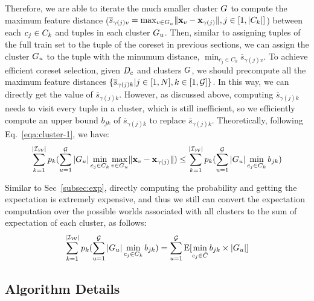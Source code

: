 Therefore,  we are able to iterate the much smaller cluster $G$ to compute  the maximum feature distance (\ie $\overline{s}_{\gamma(j)v} = \max_{v \in G_u} \lVert\mathbf{x}_v - \mathbf{x}_{\gamma(j)}\rVert, j \in [1,|C_k|]$) between each $c_j \in C_k$ and tuples in each cluster $G_u$. Then, similar to assigning tuples of the full train set to the tuple of the coreset in previous sections, we can assign the cluster $G_u$ to the tuple  with the minumum distance, \ie $\min_{c_j\in C_k} \overline{s}_{\gamma(j)v}$. To achieve efficient coreset selection, given $D_c$ and clusters $G$, we should precompute all the maximum feature distances $\{\overline{s}_{\gamma(j)k}|j \in [1,N], k \in [1,\mathcal{G}]\}$. In this way, we can directly get the value of $\overline{s}_{\gamma(j)k}$. However, as discussed above, computing $\overline{s}_{\gamma(j)k}$ needs to visit every tuple in a cluster, which is still inefficient, so we  efficiently compute an upper bound $b_{jk}$ of  $\overline{s}_{\gamma(j)k}$ to replace $\overline{s}_{\gamma(j)k}$. Theoretically, following Eq.~\ref{eqa:cluster-1}, we have:
\vspace{-0.5em}
\begin{equation}\label{eqa:cluster-3}
    \begin{aligned}
    \sum_{k= 1}^{|\mathcal{I_W}|} p_k (\sum_{u=1}^{\mathcal{G}} |G_u| \min_{c_j\in C_k} \max_{v \in G_u} \lVert\mathbf{x}_v - \mathbf{x}_{\gamma(j)}\rVert) \leq \sum_{k= 1}^{|\mathcal{I_W}|} p_k (\sum_{u=1}^{\mathcal{G}} |G_u| \min_{c_j\in C_k} b_{jk})
    \end{aligned}
\end{equation}

Similar to Sec~\ref{subsec:exp}, directly computing the probability and getting the expectation is extremely expensive, and thus we still can convert the expectation computation over the possible worlds associated with all clusters to the sum of expectation of each cluster, as follows:
\vspace{-0.5em}
\begin{equation}\label{eqa:cluster-4}
    \begin{aligned}
    \sum_{k= 1}^{|\mathcal{I_W}|} p_k (\sum_{u=1}^{\mathcal{G}} |G_u| \min_{c_j\in C_k} b_{jk}) = \sum_{u=1}^{\mathcal{G}} \mathrm{E}[\min_{c_j\in \hat{C}}b_{jk} \times |G_u|]
    \end{aligned}
\end{equation}

\subsection{Algorithm Details}



